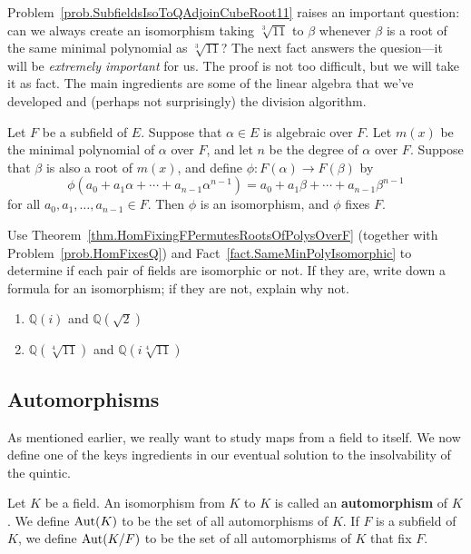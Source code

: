 Problem~\ref{prob.SubfieldsIsoToQAdjoinCubeRoot11} raises an important question: can we always create an isomorphism taking $\sqrt[3]{11}$ to $\beta$ whenever $\beta$ is a root of the same minimal polynomial as $\sqrt[3]{11}$? The next fact answers the quesion---it will be \emph{extremely important} for us. The proof is not too difficult, but we will take it as fact. The main ingredients are some of the linear algebra that we've developed and (perhaps not surprisingly) the division algorithm.

\begin{fact}\label{fact.SameMinPolyIsomorphic}
Let $F$ be a subfield of $E$. Suppose that $\alpha\in E$ is algebraic over $F$. Let $m(x)$ be the minimal polynomial of $\alpha$ over $F$, and let $n$ be the degree of $\alpha$ over $F$. Suppose that $\beta$ is also a root of $m(x)$, and define $\phi:F(\alpha)\to F(\beta)$ by
\[\phi(a_0 + a_1\alpha+\cdots+a_{n-1}\alpha^{n-1}) = a_0 + a_1\beta+\cdots+a_{n-1}\beta^{n-1}\]
for all $a_0,a_1,\ldots,a_{n-1} \in F$. Then $\phi$ is an isomorphism, and $\phi$ fixes $F$.
\end{fact}

\begin{problem}
Use Theorem~\ref{thm.HomFixingFPermutesRootsOfPolysOverF} (together with Problem~\ref{prob.HomFixesQ}) and Fact~\ref{fact.SameMinPolyIsomorphic} to determine if each pair of fields are isomorphic or not. If they are, write down a formula for an isomorphism; if they are not, explain why not.
\begin{enumerate}
\item $\mathbb{Q}(i)$ and $\mathbb{Q}(\sqrt{2})$
\item $\mathbb{Q}(\sqrt[4]{11})$ and $\mathbb{Q}(i\sqrt[4]{11})$ 
\end{enumerate}
\end{problem}

\subsection{Automorphisms}

As mentioned earlier, we really want to study maps from a field to itself. We now  define one of the keys ingredients in our eventual solution to the insolvability of the quintic.

\begin{definition}
Let $K$ be a field. An isomorphism from $K$ to $K$ is called an \textbf{automorphism} of $K$. 
We define $\operatorname{Aut}(K)$ to be the set of all automorphisms of $K$. If $F$ is a subfield of $K$, we define $\operatorname{Aut}(K/F)$ to be the set of all automorphisms of $K$ that fix $F$.
\end{definition}

